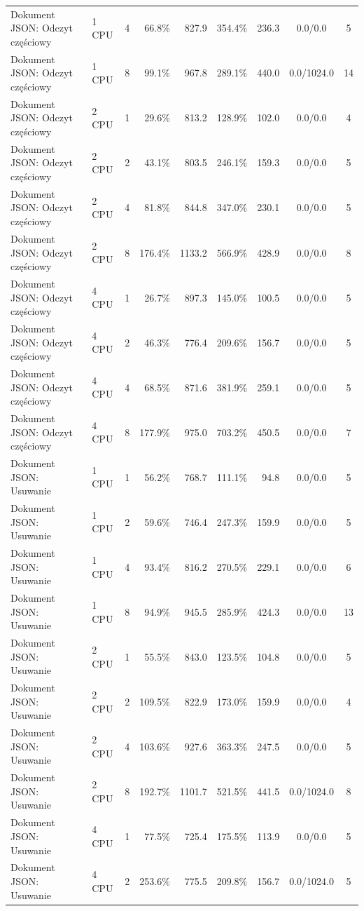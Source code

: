 \begin{table}[ht]
{\begin{tabular}{llcrrrrcc}
Dokument JSON: Odczyt częściowy & 1 CPU & 4 & 66.8\% & 827.9 & 354.4\% & 236.3 & 0.0/0.0 & 5 \\
Dokument JSON: Odczyt częściowy & 1 CPU & 8 & 99.1\% & 967.8 & 289.1\% & 440.0 & 0.0/1024.0 & 14 \\
Dokument JSON: Odczyt częściowy & 2 CPU & 1 & 29.6\% & 813.2 & 128.9\% & 102.0 & 0.0/0.0 & 4 \\
Dokument JSON: Odczyt częściowy & 2 CPU & 2 & 43.1\% & 803.5 & 246.1\% & 159.3 & 0.0/0.0 & 5 \\
Dokument JSON: Odczyt częściowy & 2 CPU & 4 & 81.8\% & 844.8 & 347.0\% & 230.1 & 0.0/0.0 & 5 \\
Dokument JSON: Odczyt częściowy & 2 CPU & 8 & 176.4\% & 1133.2 & 566.9\% & 428.9 & 0.0/0.0 & 8 \\
Dokument JSON: Odczyt częściowy & 4 CPU & 1 & 26.7\% & 897.3 & 145.0\% & 100.5 & 0.0/0.0 & 5 \\
Dokument JSON: Odczyt częściowy & 4 CPU & 2 & 46.3\% & 776.4 & 209.6\% & 156.7 & 0.0/0.0 & 5 \\
Dokument JSON: Odczyt częściowy & 4 CPU & 4 & 68.5\% & 871.6 & 381.9\% & 259.1 & 0.0/0.0 & 5 \\
Dokument JSON: Odczyt częściowy & 4 CPU & 8 & 177.9\% & 975.0 & 703.2\% & 450.5 & 0.0/0.0 & 7 \\
Dokument JSON: Usuwanie & 1 CPU & 1 & 56.2\% & 768.7 & 111.1\% & 94.8 & 0.0/0.0 & 5 \\
Dokument JSON: Usuwanie & 1 CPU & 2 & 59.6\% & 746.4 & 247.3\% & 159.9 & 0.0/0.0 & 5 \\
Dokument JSON: Usuwanie & 1 CPU & 4 & 93.4\% & 816.2 & 270.5\% & 229.1 & 0.0/0.0 & 6 \\
Dokument JSON: Usuwanie & 1 CPU & 8 & 94.9\% & 945.5 & 285.9\% & 424.3 & 0.0/0.0 & 13 \\
Dokument JSON: Usuwanie & 2 CPU & 1 & 55.5\% & 843.0 & 123.5\% & 104.8 & 0.0/0.0 & 5 \\
Dokument JSON: Usuwanie & 2 CPU & 2 & 109.5\% & 822.9 & 173.0\% & 159.9 & 0.0/0.0 & 4 \\
Dokument JSON: Usuwanie & 2 CPU & 4 & 103.6\% & 927.6 & 363.3\% & 247.5 & 0.0/0.0 & 5 \\
Dokument JSON: Usuwanie & 2 CPU & 8 & 192.7\% & 1101.7 & 521.5\% & 441.5 & 0.0/1024.0 & 8 \\
Dokument JSON: Usuwanie & 4 CPU & 1 & 77.5\% & 725.4 & 175.5\% & 113.9 & 0.0/0.0 & 5 \\
Dokument JSON: Usuwanie & 4 CPU & 2 & 253.6\% & 775.5 & 209.8\% & 156.7 & 0.0/1024.0 & 5 \\

\end{tabular}}
\end{table}
